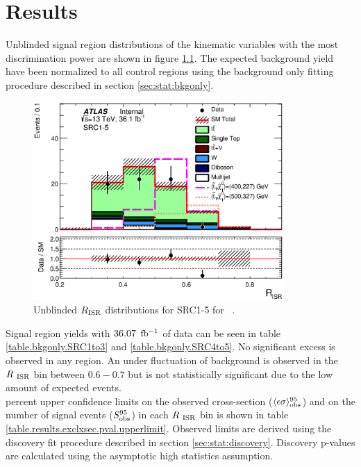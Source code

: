 \chapter{Results}
\label{chap:Results}

\indent Unblinded signal region distributions of the kinematic variables with the most discrimination power are shown in figure \ref{fig:SRCUnblined}.  The expected background yield have been normalized to all control regions using the background only fitting procedure described in section \ref{sec:stat:bkgonly}.  \\

\begin{figure}[!hp] 
\begin{center}
\includegraphics[width=0.85\textwidth]{figures/SRC/CA_RISR_SRC1_5}
\caption{Unblinded $R_{\mathrm{ISR}}$  distributions for SRC1-5 for \intlumi\ \ifb.}
\label{fig:SRCUnblined}
\end{center}
\end{figure}

\indent Signal region yields with $36.07$ $\mbox{fb$^{-1}$}$ of data can be seen in table \ref{table.bkgonly.SRC1to3} and \ref{table.bkgonly.SRC4to5}.  No significant excess is observed in any region.  An under fluctuation of background is observed in the $R_{~\mathrm{ISR}}$ bin between $0.6-0.7$ but is not statistically significant due to the low amount of expected events.  \\




 percent upper confidence limits on the observed cross-section ($\langle\epsilon\sigma\rangle_{\rm obs}^{95}$) and on the number of signal events ($S_{\rm obs}^{95}$) in each $R_{~\mathrm{ISR}}$ bin is shown in table \ref{table.results.exclxsec.pval.upperlimit}.  Observed limits are derived using the discovery fit procedure described in section \ref{sec:stat:discovery}.  Discovery p-values are calculated using the asymptotic high statistics assumption.  \\

